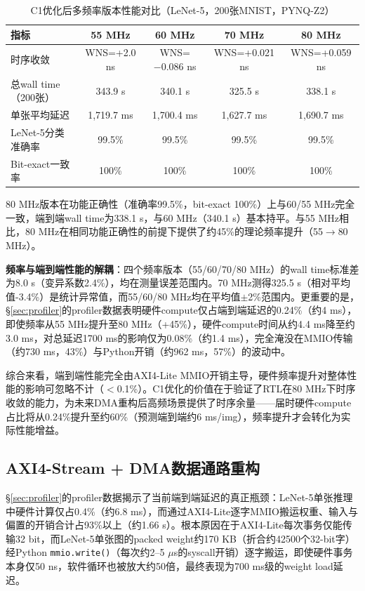\documentclass[12pt, a4paper]{article}
\begin{document}
\begin{table}[H]
    \centering
    \caption{C1优化后多频率版本性能对比（LeNet-5，200张MNIST，PYNQ-Z2）}
    \label{tab:c1_benchmark}
    \begin{tabular}{lcccc}
        \toprule
        指标 & 55 MHz & 60 MHz & 70 MHz & 80 MHz \\
        \midrule
        时序收敛 & WNS=+2.0 ns & WNS=$-0.086$ ns & WNS=+0.021 ns & WNS=+0.059 ns \\
        总wall time（200张）& 343.9 s & 340.1 s & 325.5 s & 338.1 s \\
        单张平均延迟 & 1,719.7 ms & 1,700.4 ms & 1,627.7 ms & 1,690.7 ms \\
        LeNet-5分类准确率 & 99.5\% & 99.5\% & 99.5\% & 99.5\% \\
        Bit-exact一致率 & 100\% & 100\% & 100\% & 100\% \\
        \bottomrule
    \end{tabular}
\end{table}

80 MHz版本在功能正确性（准确率99.5\%，bit-exact 100\%）上与60/55 MHz完全一致，端到端wall time为338.1 s，与60 MHz（340.1 s）基本持平。与55 MHz相比，80 MHz在相同功能正确性的前提下提供了约45\%的理论频率提升（55$\to$80 MHz）。

\textbf{频率与端到端性能的解耦}：四个频率版本（55/60/70/80 MHz）的wall time标准差为8.0 s（变异系数2.4\%），均在测量误差范围内。70 MHz测得325.5 s（相对平均值-3.4\%）是统计异常值，而55/60/80 MHz均在平均值$\pm$2\%范围内。更重要的是，§\ref{sec:profiler}的profiler数据表明硬件compute仅占端到端延迟的0.24\%（约4 ms），即使频率从55 MHz提升至80 MHz（+45\%），硬件compute时间从约4.4 ms降至约3.0 ms，对总延迟1700 ms的影响仅为0.08\%（约1.4 ms），完全淹没在MMIO传输（约730 ms，43\%）与Python开销（约962 ms，57\%）的波动中。

综合来看，端到端性能完全由AXI4-Lite MMIO开销主导，硬件频率提升对整体性能的影响可忽略不计（$<$0.1\%）。C1优化的价值在于验证了RTL在80 MHz下时序收敛的能力，为未来DMA重构后高频场景提供了时序余量——届时硬件compute占比将从0.24\%提升至约60\%（预测端到端约6 ms/img），频率提升才会转化为实际性能增益。

\subsection{AXI4-Stream + DMA数据通路重构}
\label{sec:c3_dma}

§\ref{sec:profiler}的profiler数据揭示了当前端到端延迟的真正瓶颈：LeNet-5单张推理中硬件计算仅占0.4\%（约6.8 ms），而通过AXI4-Lite逐字MMIO搬运权重、输入与偏置的开销合计占93\%以上（约1.66 s）。根本原因在于AXI4-Lite每次事务仅能传输32 bit，而LeNet-5单张图的packed weight约170 KB（折合约42500个32-bit字）经Python \texttt{mmio.write()}（每次约2--5 $\mu$s的syscall开销）逐字搬运，即使硬件事务本身仅50 ns，软件循环也被放大约50倍，最终表现为700 ms级的weight load延迟。
\end{document}
